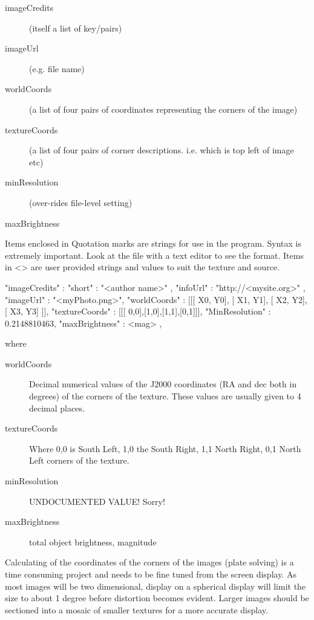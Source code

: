 \begin{description}
  \begin{description}
  \item[imageCredits] (itself a list of key/pairs)
  \item[imageUrl] (e.g. file name)
  \item[worldCoords] (a list of four pairs of coordinates representing the corners of the image)
  \item[textureCoords] (a list of four pairs of corner descriptions. i.e. which is top left of image etc)
  \item[minResolution] (over-rides file-level setting)
  \item[maxBrightness]
  \end{description}
\end{description}

Items enclosed in Quotation marks are strings for use in the program.
Syntax is extremely important. Look at the file with a text editor to
see the format. Items in \textless{}\textgreater{} are user provided
strings and values to suit the texture and source.

\begin{configfileScr}
{
  "imageCredits"  : { "short" : "<author name>" , 
                      "infoUrl" : "http://<mysite.org>" 
                    }, 
  "imageUrl"      : "<myPhoto.png>",
  "worldCoords"   : [[[ X0, Y0], [ X1, Y1], [ X2, Y2], [ X3, Y3] ]], 
  "textureCoords" : [[[ 0,0],[1,0],[1,1],[0,1]]], 
  "MinResolution" : 0.2148810463,
  "maxBrightness" : <mag>
},
\end{configfileScr}

where 

\begin{description}
\item[worldCoords] Decimal numerical values of the J2000 coordinates (RA and dec both in degrees) of the corners of the texture. These values are usually given to 4 decimal places.
\item[textureCoords]  Where 0,0 is South Left, 1,0 the South Right, 1,1 North Right, 0,1 North Left corners of the texture.
\item[minResolution] UNDOCUMENTED VALUE! Sorry!%
\item[maxBrightness] total object brightness, magnitude 
\end{description}


Calculating of the coordinates of the corners of the images (plate solving) is
a time consuming project and needs to be fine tuned from the screen
display. As most images will be two dimensional, display on a spherical
display will limit the size to about 1 degree before distortion becomes
evident. Larger images should be sectioned into a mosaic of smaller
textures for a more accurate display.

